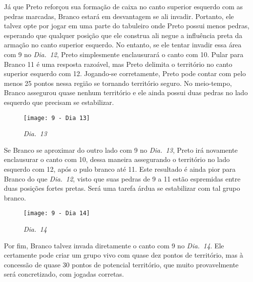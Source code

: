 \bigskip

Já que Preto reforçou sua formação de caixa no canto superior esquerdo com as pedras marcadas, Branco estará em desvantagem se ali invadir. Portanto, ele talvez opte por jogar em uma parte do tabuleiro onde Preto possui menos pedras, esperando que qualquer posição que ele construa ali negue a influência preta da armação no canto superior esquerdo. No entanto, se ele tentar invadir essa área com 9 no \emph{Dia.\@~12}, Preto simplesmente enclausurará o canto com 10. Pular para Branco 11 é uma resposta razoável, mas Preto delimita o território no canto superior esquerdo com 12. Jogando-se corretamente, Preto pode contar com pelo menos 25 pontos nessa região se tornando território seguro. No meio-tempo, Branco assegurou quase nenhum território e ele ainda possui duas pedras no lado esquerdo que precisam se estabilizar.

\begin{wrapfigure}{r}{60mm}
    \vspace{-27.5pt}
    \begin{center}
        \texttt{[image: 9 - Dia 13]}
        \captionsetup{justification=centering}
        \caption*{\emph{Dia.\@~13}}
    \end{center}
    \vspace{-10pt}
\end{wrapfigure}

Se Branco se aproximar do outro lado com 9 no \emph{Dia.\@~13}, Preto irá novamente enclausurar o canto com 10, dessa maneira assegurando o território no lado esquerdo com 12, após o pulo branco até 11. Este resultado é ainda pior para Branco do que \emph{Dia.\@~12}, visto que suas pedras de 9 a 11 estão espremidas  entre duas posições fortes pretas. Será uma tarefa árdua se estabilizar com tal grupo branco.

\begin{wrapfigure}{l}{60mm}
    \vspace{-25pt}
    \begin{center}
        \texttt{[image: 9 - Dia 14]}
        \captionsetup{justification=centering}
        \caption*{\emph{Dia.\@~14}}
    \end{center}
    \vspace{-25pt}
\end{wrapfigure}

Por fim, Branco talvez invada diretamente o canto com 9 no \emph{Dia.\@~14}. Ele certamente pode criar um grupo vivo com quase dez pontos de território, mas à concessão de quase 30 pontos de potencial território, que muito provavelmente será concretizado, com jogadas corretas.

